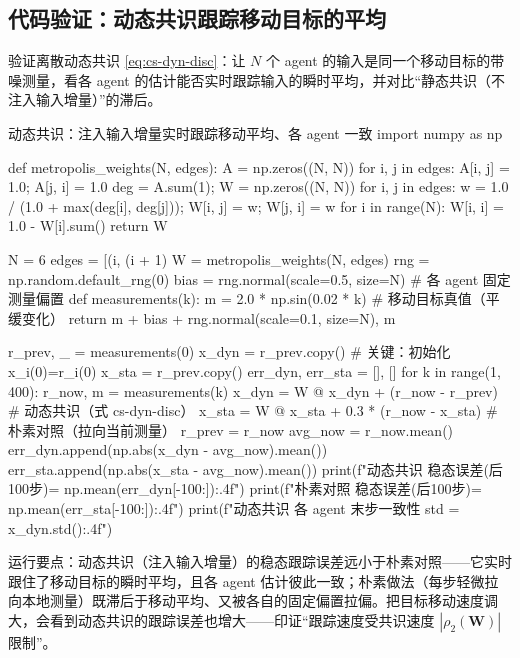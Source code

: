 \subsection{代码验证：动态共识跟踪移动目标的平均}
\label{sec:cs-dyn-code}

验证离散动态共识 \cref{eq:cs-dyn-disc}：让 $N$ 个 agent 的输入是同一个移动目标的带噪测量，看各 agent 的估计能否实时跟踪输入的瞬时平均，并对比“静态共识（不注入输入增量）”的滞后。

\begin{codebox}[Python]{动态共识：注入输入增量实时跟踪移动平均、各 agent 一致}
import numpy as np

def metropolis_weights(N, edges):
    A = np.zeros((N, N))
    for i, j in edges:
        A[i, j] = 1.0; A[j, i] = 1.0
    deg = A.sum(1); W = np.zeros((N, N))
    for i, j in edges:
        w = 1.0 / (1.0 + max(deg[i], deg[j])); W[i, j] = w; W[j, i] = w
    for i in range(N):
        W[i, i] = 1.0 - W[i].sum()
    return W

N = 6
edges = [(i, (i + 1) %
W = metropolis_weights(N, edges)
rng = np.random.default_rng(0)
bias = rng.normal(scale=0.5, size=N)                  # 各 agent 固定测量偏置
def measurements(k):
    m = 2.0 * np.sin(0.02 * k)                         # 移动目标真值（平缓变化）
    return m + bias + rng.normal(scale=0.1, size=N), m

r_prev, _ = measurements(0)
x_dyn = r_prev.copy()                                  # 关键：初始化 x_i(0)=r_i(0)
x_sta = r_prev.copy()
err_dyn, err_sta = [], []
for k in range(1, 400):
    r_now, m = measurements(k)
    x_dyn = W @ x_dyn + (r_now - r_prev)               # 动态共识（式 cs-dyn-disc）
    x_sta = W @ x_sta + 0.3 * (r_now - x_sta)          # 朴素对照（拉向当前测量）
    r_prev = r_now
    avg_now = r_now.mean()
    err_dyn.append(np.abs(x_dyn - avg_now).mean())
    err_sta.append(np.abs(x_sta - avg_now).mean())
print(f"动态共识 稳态误差(后100步)= {np.mean(err_dyn[-100:]):.4f}")
print(f"朴素对照 稳态误差(后100步)= {np.mean(err_sta[-100:]):.4f}")
print(f"动态共识 各 agent 末步一致性 std = {x_dyn.std():.4f}")
\end{codebox}

\noindent 运行要点：动态共识（注入输入增量）的稳态跟踪误差远小于朴素对照——它实时跟住了移动目标的瞬时平均，且各 agent 估计彼此一致；朴素做法（每步轻微拉向本地测量）既滞后于移动平均、又被各自的固定偏置拉偏。把目标移动速度调大，会看到动态共识的跟踪误差也增大——印证“跟踪速度受共识速度 $|\rho_2(\mathbf{W})|$ 限制”。

